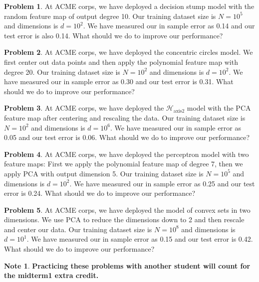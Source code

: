 \documentclass[10pt]{exam}
\theoremstyle{definition}
\newtheorem{problem}{Problem}
\newtheorem{note}{Note}
\newcommand{\HH}[1]{\mathcal H_{\text{#1}}}
\begin{document}
\begin{problem}
At ACME corps, we have deployed a decision stump model with the random feature map of output degree 10.
Our training dataset size is $N=10^5$ and dimensions is $d=10^2$.
We have measured our in sample error as 0.14 and our test error is also 0.14.
What should we do to improve our performance?
\end{problem}

\begin{problem}
At ACME corps, we have deployed the concentric circles model.
We first center out data points and then apply the polynomial feature map with degree 20.
Our training dataset size is $N=10^2$ and dimensions is $d=10^2$.
We have measured our in sample error as 0.30 and our test error is 0.31.
What should we do to improve our performance?
\end{problem}

\begin{problem}
At ACME corps, we have deployed the $\HH{axis2}$ model with the PCA feature map after centering and rescaling the data.
Our training dataset size is $N=10^2$ and dimensions is $d=10^6$.
We have measured our in sample error as 0.05 and our test error is 0.06.
What should we do to improve our performance?
\end{problem}

\begin{problem}
At ACME corps, we have deployed the perceptron model with two feature maps: First we apply the polynomial feature map of degree 7, then we apply PCA with output dimension 5.
Our training dataset size is $N=10^5$ and dimensions is $d=10^2$.
We have measured our in sample error as 0.25 and our test error is 0.24.
What should we do to improve our performance?
\end{problem}

\begin{problem}
At ACME corps, we have deployed the model of convex sets in two dimensions.  We use PCA to reduce the dimensions down to 2 and then rescale and center our data.
Our training dataset size is $N=10^8$ and dimensions is $d=10^1$.
We have measured our in sample error as 0.15 and our test error is 0.42.
What should we do to improve our performance?
\end{problem}


\begin{note}
    \textbf{Practicing these problems with another student will count for the midterm1 extra credit.}
\end{note}
\end{document}
